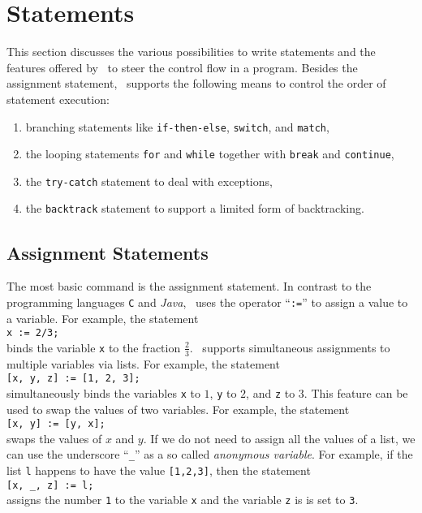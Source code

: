 \chapter{Statements}
This section discusses the various possibilities to write statements and the 
features offered by \setlx\ to steer the control flow in a program.
Besides the assignment statement, \setlx\ supports the following means to control the order of statement execution:
\begin{enumerate}
\item branching statements like \texttt{if-then-else}, \texttt{switch}, and \texttt{match},
\item the looping statements \texttt{for} and \texttt{while} together with \texttt{break} and
      \texttt{continue}, 
\item the \texttt{try-catch} statement to deal with exceptions,
\item the \texttt{backtrack} statement to support a limited form of backtracking.
\end{enumerate}

\section{Assignment Statements}
The most basic command is the assignment statement.  In contrast to the programming languages \texttt{C}
and \textsl{Java}, \setlx\ uses the operator ``\texttt{:=}'' to assign a value to a variable.  For example, the statement
\\[0.2cm]
\hspace*{1.3cm}
\texttt{x := 2/3;}
\\[0.2cm]
binds the variable \texttt{x} to the fraction $\frac{2}{3}$.  \setlx\ supports simultaneous
assignments to multiple variables via lists.  For example, the statement
\\[0.2cm]
\hspace*{1.3cm}
\texttt{[x, y, z] := [1, 2, 3];}
\\[0.2cm]
simultaneously binds the variables \texttt{x} to $1$, \texttt{y} to $2$, and \texttt{z} to $3$.
This feature can be used to swap the values of two variables. For example,  the statement
\\[0.2cm]
\hspace*{1.3cm}
\texttt{[x, y] := [y, x];}
\\[0.2cm]
swaps the values of $x$ and $y$.  If we do not need to assign all the values of a list, we
can use the underscore ``\texttt{\_}'' as a so called \emph{anonymous variable}.  For example, if
the list \texttt{l} happens to have the value \texttt{[1,2,3]}, then the statement
\\[0.2cm]
\hspace*{1.3cm}
\texttt{[x, \_, z] := l;} 
\\[0.2cm]
assigns the number \texttt{1} to the variable \texttt{x} and the variable \texttt{z} is
is set to \texttt{3}.


